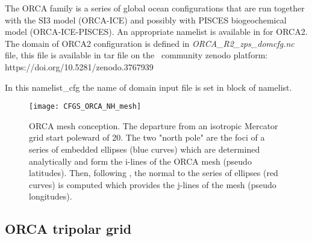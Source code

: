 \documentclass[../main/NEMO_manual]{subfiles}
\begin{document}
The ORCA family is a series of global ocean configurations that are run together with
the SI3 model (ORCA-ICE) and possibly with PISCES biogeochemical model (ORCA-ICE-PISCES).
An appropriate namelist is available in  for ORCA2.
The domain of ORCA2 configuration is defined in \textit{ORCA\_R2\_zps\_domcfg.nc} file,
this file is available in tar file on the \NEMO\ community zenodo platform: \\
https://doi.org/10.5281/zenodo.3767939

In this namelist\_cfg the name of domain input file is set in  block of namelist.

\begin{figure}[!t]
  \centering
  \texttt{[image: CFGS\_ORCA\_NH\_mesh]}
  \caption[ORCA mesh conception]{
    ORCA mesh conception.
    The departure from an isotropic Mercator grid start poleward of 20.
    The two "north pole" are the foci of a series of embedded ellipses (blue curves) which
    are determined analytically and form the i-lines of the ORCA mesh (pseudo latitudes).
    Then, following \citet{madec.imbard_CD96},
    the normal to the series of ellipses (red curves) is computed which
    provides the j-lines of the mesh (pseudo longitudes).}
  \label{fig:CFGS_ORCA_msh}
\end{figure}

\subsection{ORCA tripolar grid}
\label{subsec:CFGS_orca_grid}
\end{document}
